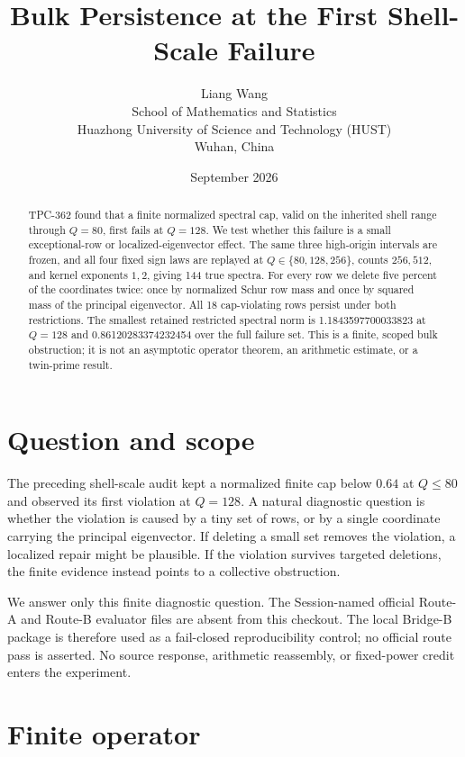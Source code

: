 \documentclass[10pt]{article}
\title{Bulk Persistence at the First Shell-Scale Failure}
\author{Liang Wang\\
\small School of Mathematics and Statistics\\
\small Huazhong University of Science and Technology (HUST)\\
\small Wuhan, China}
\date{September 2026}
\begin{document}
\maketitle

\begin{abstract}
TPC-362 found that a finite normalized spectral cap, valid on the inherited
shell range through $Q=80$, first fails at $Q=128$.  We test whether this
failure is a small exceptional-row or localized-eigenvector effect.  The
same three high-origin intervals are frozen, and all four fixed sign laws are
replayed at $Q\in\{80,128,256\}$, counts $256,512$, and kernel exponents
$1,2$, giving 144 true spectra.  For every row we delete five percent of the
coordinates twice: once by normalized Schur row mass and once by squared mass
of the principal eigenvector.  All 18 cap-violating rows persist under both
restrictions.  The smallest retained restricted spectral norm is
1.1843597700033823 at $Q=128$ and 0.86120283374232454 over the full failure
set.  This is a finite, scoped bulk obstruction; it is not an asymptotic
operator theorem, an arithmetic estimate, or a twin-prime result.
\end{abstract}

\section{Question and scope}

The preceding shell-scale audit kept a normalized finite cap below $0.64$ at
$Q\leq80$ and observed its first violation at $Q=128$.  A natural diagnostic
question is whether the violation is caused by a tiny set of rows, or by a
single coordinate carrying the principal eigenvector.  If deleting a small
set removes the violation, a localized repair might be plausible.  If the
violation survives targeted deletions, the finite evidence instead points to
a collective obstruction.

We answer only this finite diagnostic question.  The Session-named official
Route-A and Route-B evaluator files are absent from this checkout.  The local
Bridge-B package is therefore used as a fail-closed reproducibility control;
no official route pass is asserted.  No source response, arithmetic
reassembly, or fixed-power credit enters the experiment.

\section{Finite operator}
\end{document}
